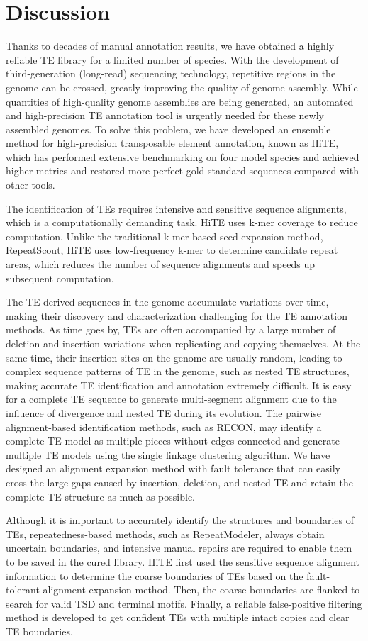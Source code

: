 \documentclass{bmcart}
\begin{document}
\section*{Discussion}
Thanks to decades of manual annotation results, we have obtained a highly reliable TE library for a limited number of species. With the development of third-generation (long-read) sequencing technology, repetitive regions in the genome can be crossed, greatly improving the quality of genome assembly. While quantities of high-quality genome assemblies are being generated, an automated and high-precision TE annotation tool is urgently needed for these newly assembled genomes. To solve this problem, we have developed an ensemble method for high-precision transposable element annotation, known as HiTE, which has performed extensive benchmarking on four model species and achieved higher metrics and restored more perfect gold standard sequences compared with other tools.

The identification of TEs requires intensive and sensitive sequence alignments, which is a computationally demanding task. HiTE uses k-mer coverage to reduce computation. Unlike the traditional k-mer-based seed expansion method, RepeatScout, HiTE uses low-frequency k-mer to determine candidate repeat areas, which reduces the number of sequence alignments and speeds up subsequent computation. 

The TE-derived sequences in the genome accumulate variations over time, making their discovery and characterization challenging for the TE annotation methods. As time goes by, TEs are often accompanied by a large number of deletion and insertion variations when replicating and copying themselves. At the same time, their insertion sites on the genome are usually random, leading to complex sequence patterns of TE in the genome, such as nested TE structures, making accurate TE identification and annotation extremely difficult. It is easy for a complete TE sequence to generate multi-segment alignment due to the influence of divergence and nested TE during its evolution. The pairwise alignment-based identification methods, such as RECON, may identify a complete TE model as multiple pieces without edges connected and generate multiple TE models using the single linkage clustering algorithm. We have designed an alignment expansion method with fault tolerance that can easily cross the large gaps caused by insertion, deletion, and nested TE and retain the complete TE structure as much as possible.

Although it is important to accurately identify the structures and boundaries of TEs, repeatedness-based methods, such as RepeatModeler\cite{Smit2008repeatmodeler}, always obtain uncertain boundaries, and intensive manual repairs are required to enable them to be saved in the cured library\cite{storer2022methodologies}. HiTE first used the sensitive sequence alignment information to determine the coarse boundaries of TEs based on the fault-tolerant alignment expansion method. Then, the coarse boundaries are flanked to search for valid TSD and terminal motifs. Finally, a reliable false-positive filtering method is developed to get confident TEs with multiple intact copies and clear TE boundaries.
\end{document}

